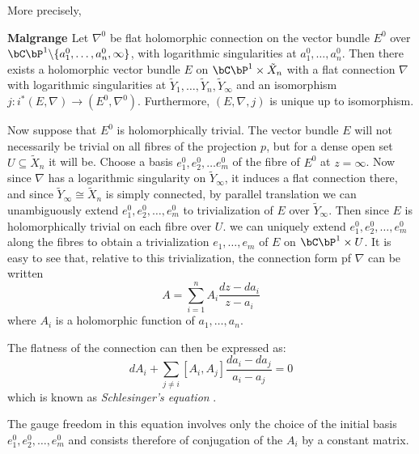  More precisely,

\begin{theorem}\label{art7-thm-1}
{\bf Malgrange \cite{art7-key10}} Let $\nabla^{0}$ be flat holomorphic connection on the vector bundle $E^{0}$ over $\bC\bP^{1}\backslash \{ a_{1}^{0}, \ldots, a_{n}^{0}, \infty\}$, with logarithmic singularities at $a_{1}^{0}, \ldots, a_{n}^{0}$. Then there exists a holomorphic vector bundle $E$ on $\bC \bP^{1} \times \tilde{X}_{n}$ with a flat connection $\nabla$ with logarithmic singularities at $\tilde{Y}_{1}, \ldots,\tilde{Y}_{n}, \tilde{Y}_{\infty}$ and an isomorphism $j : i^{*} (E, \nabla) \rightarrow (E^{0}, \nabla^{0})$. Furthermore, $(E, \nabla, j)$ is unique up to isomorphism.
\end{theorem}

 Now suppose that $E^{0}$ is holomorphically trivial. The vector bundle $E$ will not necessarily be trivial on all fibres of the projection $p$, but for a dense open set $U \subseteq \tilde{X}_{n}$ it will be. Choose a basis $e_{1}^{0}, e_{2}^{0}, \ldots e_{m}^{0}$ of the fibre of $E^{0}$ at $z = \infty$. Now since $\nabla$ has a logarithmic singularity on $\tilde{Y}_{\infty}$, it induces a flat connection there, and since $\tilde{Y}_{\infty} \cong \tilde{X}_{n}$ is simply connected, by parallel translation we can unambiguously extend $e_{1}^{0}, e_{2}^{0}, \ldots, e_{m}^{0}$ to trivialization of $E$ over $\tilde{Y}_{\infty}$. Then since $E$ is holomorphically trivial on each fibre over $U$. we can uniquely extend $e_{1}^{0}, e_{2}^{0}, \ldots, e_{m}^{0}$ along the fibres to obtain a trivialization $e_{1}, \ldots, e_{m}$ of $E$ on $\bC\bP^{1} \times U$. It is easy to see that, relative to this trivialization, the connection form pf $\nabla$ can be written
\begin{equation}\label{art7-eq-2}
A = \sum\limits_{i=1}^{n}A_{i} \dfrac{dz-da_{i}}{z-a_{i}}
\end{equation}
where $A_{i}$ is a holomorphic function of $a_{1}, \ldots, a_{n}$.

The flatness of the connection can then be expressed as:
$$
dA_{i} + \sum\limits_{j\neq i}[A_{i}, A_{j}]\dfrac{da_{i}-da_{j}}{a_{i}-a_{j}} =0
$$
which is known as \textit{Schlesinger's equation} \cite{art7-key15}.

The gauge freedom in this equation involves only the choice of the initial basis $e_{1}^{0}, e_{2}^{0}, \ldots, e_{m}^{0}$ and consists therefore of conjugation of the $A_{i}$ by a constant matrix.

